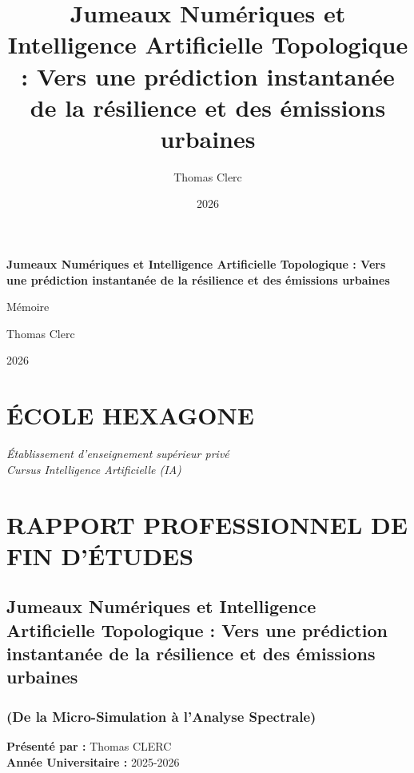 \documentclass[10pt, a4paper]{article}
\title{Jumeaux Numériques et Intelligence Artificielle Topologique :
Vers une prédiction instantanée de la résilience et des émissions
urbaines}
\author{Thomas Clerc}
\date{2026}
\begin{document}
\begin{titlepage}
\centering
\vspace*{2cm}
{\Huge\bfseries Jumeaux Numériques et Intelligence Artificielle
Topologique : Vers une prédiction instantanée de la résilience et des
émissions urbaines\par}
\vspace{1.5cm}
{\Large Mémoire\par}
\vspace{1cm}
{\large Thomas Clerc\par}
\vspace{0.5cm}
{\large 2026\par}
\vfill
\end{titlepage}

\tableofcontents
\newpage

\section{ÉCOLE HEXAGONE}\label{uxe9cole-hexagone}

\emph{Établissement d'enseignement supérieur privé}\\
\emph{Cursus Intelligence Artificielle (IA)}

\section{RAPPORT PROFESSIONNEL DE FIN
D'ÉTUDES}\label{rapport-professionnel-de-fin-duxe9tudes}

\subsection{Jumeaux Numériques et Intelligence Artificielle Topologique
: Vers une prédiction instantanée de la résilience et des émissions
urbaines}\label{jumeaux-numuxe9riques-et-intelligence-artificielle-topologique-vers-une-pruxe9diction-instantanuxe9e-de-la-ruxe9silience-et-des-uxe9missions-urbaines}

\subsubsection{(De la Micro-Simulation à l'Analyse
Spectrale)}\label{de-la-micro-simulation-uxe0-lanalyse-spectrale}

\textbf{Présenté par :} Thomas CLERC\\
\textbf{Année Universitaire :} 2025-2026
\end{document}
